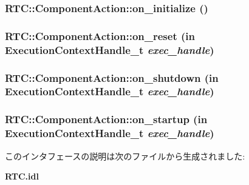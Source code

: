 \subsubsection[{on\_\-initialize}]{ RTC::ComponentAction::on\_\-initialize ()}\label{interfaceRTC_1_1ComponentAction_a8703b183bc1bed9e2fd3ecac126cb231}
\subsubsection[{on\_\-reset}]{ RTC::ComponentAction::on\_\-reset (in {\bf ExecutionContextHandle\_\-t} {\em exec\_\-handle})}\label{interfaceRTC_1_1ComponentAction_adb0e61bff251337d79c7c7d050d8304e}
\subsubsection[{on\_\-shutdown}]{ RTC::ComponentAction::on\_\-shutdown (in {\bf ExecutionContextHandle\_\-t} {\em exec\_\-handle})}\label{interfaceRTC_1_1ComponentAction_accc47711344c811c9bdba0d66a3048f2}
\subsubsection[{on\_\-startup}]{ RTC::ComponentAction::on\_\-startup (in {\bf ExecutionContextHandle\_\-t} {\em exec\_\-handle})}\label{interfaceRTC_1_1ComponentAction_ac305f00c92f4650cf4fc798aac37eef2}


このインタフェースの説明は次のファイルから生成されました:\begin{DoxyCompactItemize}
\item 
{\bf RTC.idl}\end{DoxyCompactItemize}
